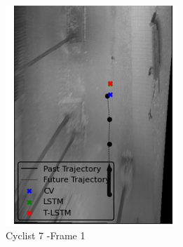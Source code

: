 \documentclass{article}
\begin{document}
\begin{figure}[H]
\centering
\begin{subfigure}{0.39\textwidth}
  \centering
  \includegraphics[width=\linewidth]{quali_results/cyc-7-speed.png}
  \caption{Cyclist 7 -Frame 1}
  \label{fig:cyc7-speed}
\end{subfigure}
\begin{subfigure}{0.39\textwidth}
  \centering

\end{subfigure}
\end{figure}
\end{document}
